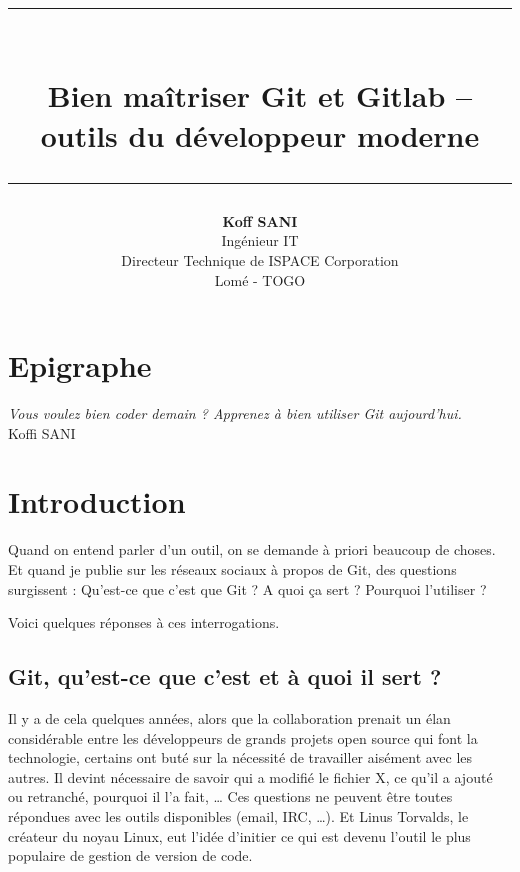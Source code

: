 \documentclass[11pt, a4paper]{book}
\author{\textbf{Koff SANI} \\ Ing\'enieur IT \\ Directeur Technique de ISPACE Corporation \\ Lomé - TOGO}
\begin{document}
\title{ \begin{figure} \begin{center}
 \end{center} \end{figure}
 \rule{13cm}{0.15cm}\\
  \textbf{\textbf{ Bien ma\^itriser Git et Gitlab -- outils du développeur moderne }}\\ 
 \rule{13cm
}{0.15cm}
}
 
\date{}

\maketitle
\chapter*{Epigraphe}
\begin{flushright}
\emph{ Vous voulez bien coder demain ? Apprenez à bien utiliser Git aujourd'hui.}\\ Koffi SANI
\end{flushright}

\tableofcontents
\setcounter{tocdepth}{3}
\newcommand{\ud}{\mathrm{d}}
\newcommand{\lo}{\mathrm{Log}}
\newcommand{\arct}{\mathrm{Arctan}}

\chapter{Introduction}

Quand on entend parler d’un outil, on se demande à priori beaucoup de choses. Et quand je publie sur les réseaux sociaux à propos de Git, des questions surgissent : Qu’est-ce que c’est que Git ? A quoi ça sert ? Pourquoi l’utiliser ?

Voici quelques réponses à ces interrogations.
\section{Git, qu'est-ce que c'est et à quoi il sert ? }

Il y a de cela quelques années, alors que la collaboration prenait un élan considérable entre les développeurs de grands projets open source qui font la technologie, certains ont buté sur la nécessité de travailler aisément avec les autres. Il devint nécessaire de savoir qui a modifié le fichier X, ce qu’il a ajouté ou retranché, pourquoi il l’a fait, … Ces questions ne peuvent être toutes répondues avec les outils disponibles (email, IRC, …). Et Linus Torvalds, le créateur du noyau Linux, eut l’idée d’initier ce qui est devenu l’outil le plus populaire de gestion de version de code.
\end{document}
